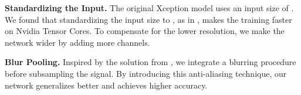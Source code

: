 \textbf{Standardizing the Input.}
The original Xception model uses an input size of . We found that standardizing the input size to , as in \citet{HeEtAl2015}, makes the training faster on Nvidia Tensor Cores. To compensate for the lower resolution, we make the network wider by adding more channels. 

\textbf{Blur Pooling.}
Inspired by the solution from \citet{Zhang2019}, we integrate a blurring procedure before subsampling the signal. By introducing this anti-aliasing technique, our network generalizes better and achieves higher accuracy.

